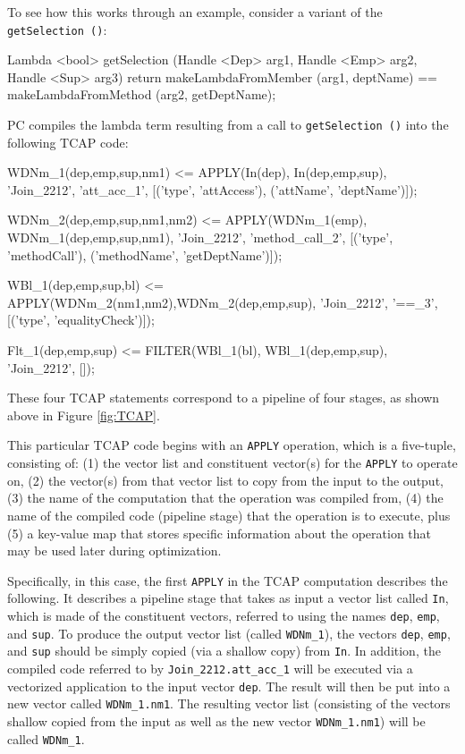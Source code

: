To see how this works through an example, consider a variant of the \texttt{getSelection ()}:

\begin{codesmall} 
Lambda <bool> getSelection (Handle <Dep> arg1, Handle <Emp> arg2, Handle <Sup> arg3) {
	return makeLambdaFromMember (arg1, deptName) == 
	       makeLambdaFromMethod (arg2, getDeptName);  }
\end{codesmall}

\noindent PC compiles the lambda term resulting from a call to \texttt{getSelection ()} into the following TCAP code:

\begin{codesmall}
WDNm_1(dep,emp,sup,nm1) <= APPLY(In(dep), In(dep,emp,sup), 'Join_2212', 'att_acc_1', 
  [('type', 'attAccess'), ('attName', 'deptName')]);

WDNm_2(dep,emp,sup,nm1,nm2) <= APPLY(WDNm_1(emp), WDNm_1(dep,emp,sup,nm1), 'Join_2212',
  'method_call_2', [('type', 'methodCall'), ('methodName', 'getDeptName')]);

WBl_1(dep,emp,sup,bl) <= APPLY(WDNm_2(nm1,nm2),WDNm_2(dep,emp,sup), 'Join_2212', '==_3', 
  [('type', 'equalityCheck')]);

Flt_1(dep,emp,sup) <= FILTER(WBl_1(bl), WBl_1(dep,emp,sup), 'Join_2212', []);
\end{codesmall}

\noindent
These four TCAP statements correspond to a pipeline of four stages,
as shown above in Figure \ref{fig:TCAP}.

This particular TCAP code begins with an \texttt{APPLY} operation, which is a five-tuple, consisting of: (1) the vector list and constituent
vector(s) for the \texttt{APPLY} to operate on, (2) the vector(s) from that vector list to copy
from the input to the output, (3) the name of the computation that the operation was compiled from, (4) the name of the compiled code (pipeline stage)
that the operation is to execute, plus (5) a key-value map that stores specific information about the operation that may be used 
later during optimization.

Specifically, in this case, the first \texttt{APPLY} in the TCAP computation describes the following.  It describes a pipeline stage that
takes as input 
a vector list called \texttt{In}, which is made of the constituent vectors, referred to using 
the names \texttt{dep}, \texttt{emp}, and \texttt{sup}.
To produce the output vector list (called \texttt{WDNm\_1}), the vectors
\texttt{dep}, \texttt{emp}, and \texttt{sup} should be simply copied (via a shallow copy) from \texttt{In}.
In addition, the compiled code referred to by \texttt{Join\_2212.att\_acc\_1} will be executed via a vectorized application to the input
vector \texttt{dep}.  The result will then be put into a new vector called 
\texttt{WDNm\_1.nm1}.
The resulting vector list (consisting of the vectors shallow copied from the input as well as the new vector \texttt{WDNm\_1.nm1})
will be called \texttt{WDNm\_1}.  

